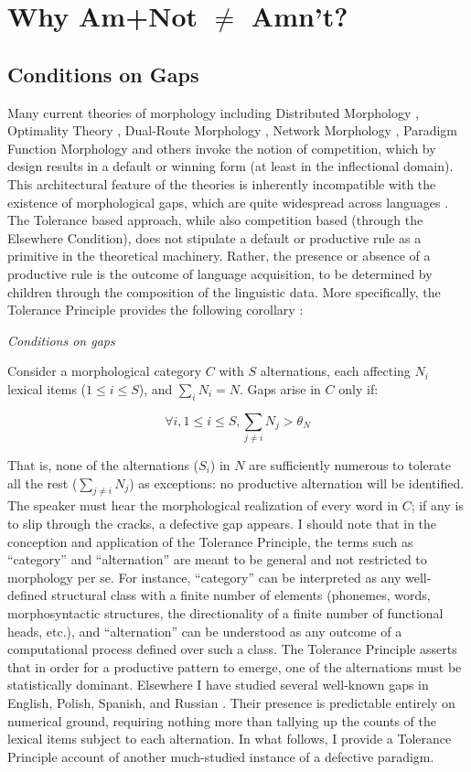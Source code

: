 \documentclass[output=paper,
modfonts
]{LSP/langsci}
\begin{document}
\section{Why Am+Not $\neq$ Amn't?}
\subsection{Conditions on Gaps}
Many current theories of morphology including Distributed Morphology
\citep{Halle1993}, Optimality Theory \citep{OT}, Dual-Route Morphology
\citep{Pinker1999, Clahsen1999}, Network Morphology \citep{Brown2012},
Paradigm Function Morphology \citep{Stump2001b} and others invoke the
notion of competition, which by design results in a default or winning
form (at least in the inflectional domain). This architectural feature
of the theories is
inherently incompatible with the  existence of morphological gaps,
which are  quite widespread across languages \citep{Baerman2010a}. 
The Tolerance based approach, while also 
competition based  (through the Elsewhere
Condition), does not stipulate a default or productive rule as a 
primitive in the theoretical machinery. Rather,  the presence or absence
of a productive rule is the outcome of 
language acquisition, to be determined by children
through the composition of the linguistic data. 
 More specifically, the Tolerance
Principle provides the following corollary \citep[][p142]{POP}:  
\begin{exe} \ex \label{gaptheorem} \textit{Conditions on gaps}

Consider a morphological category $C$ with $S$ alternations, each
affecting $N_i$ lexical items ($1\leq i \leq S$),  and $\sum_i N_i =
N$. Gaps arise in $C$ only if: 

 \[\forall i, 1\leq i\leq S, \sum_{j\neq i} N_j > \theta_N \]
\end{exe}  
\noindent That is, none of the alternations ($S_i$) in $N$ are
sufficiently numerous to tolerate all the rest ($\sum_{j\neq i} N_j$) as
exceptions:  no productive alternation  will be identified. The
speaker must hear the morphological realization of every word in $C$;
if any is to slip through the cracks, a defective gap appears.  I
should note that in the conception and application of the Tolerance
Principle, the terms such as 
``category'' and ``alternation'' are meant to be
general and not restricted to morphology per se. For instance,
``category'' can be interpreted as any well-defined 
structural class with a finite number of  elements (phonemes, words,
morphosyntactic structures, the directionality of a finite number of
functional heads, etc.), and ``alternation'' can be understood as any
outcome of a computational process defined over such a class. The Tolerance
Principle asserts that in order for a productive pattern to emerge,
one of the alternations must be statistically dominant. Elsewhere 
 I have studied  several well-known gaps in English,
Polish, Spanish, and Russian \citep[][Chapter 5]{POP}. Their presence is
predictable entirely on numerical ground, requiring nothing more than
tallying up the counts of the lexical items subject to each
alternation. 
In what follows, I  provide a Tolerance Principle account of 
another much-studied instance of a defective paradigm. 
\end{document}
